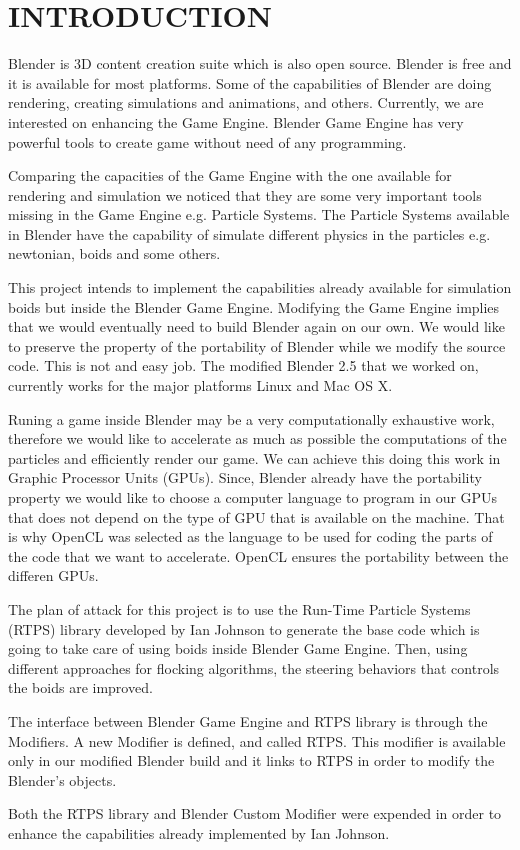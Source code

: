 \chapter{INTRODUCTION}


Blender is 3D content creation suite which is also open source. Blender is free and it is available for most platforms. Some of the capabilities of Blender are doing rendering, creating simulations and animations, and others. Currently, we are interested on enhancing the Game Engine. Blender Game Engine has very powerful tools to create game without need of any programming.  

Comparing the capacities of the Game Engine with the one available for rendering and simulation we noticed that they are some very important tools missing in the Game Engine e.g. Particle Systems. The Particle Systems available in Blender have the capability of simulate different physics in the particles e.g. newtonian, boids and some others. 

This project intends to implement the capabilities already available for simulation boids but inside the Blender Game Engine. Modifying the Game Engine implies that we would eventually need to build Blender again on our own. We would like to preserve the property of the portability of Blender while we modify the source code. This is not and easy job. The modified Blender 2.5 that we worked on, currently works for the major platforms Linux and Mac OS X.

Runing a  game inside Blender may be a very computationally exhaustive work, therefore we would like to  accelerate as much as possible the computations of the particles and efficiently render our game. We can achieve this doing this work in Graphic Processor Units (GPUs). Since, Blender already have the portability property we would like to choose a computer language to program in our GPUs that does not depend on the type of GPU that is available on the machine. That is why OpenCL was selected as the language to be used for coding the parts of the code that we want to accelerate. OpenCL ensures the portability between the differen GPUs.

The plan of attack for this project is to use the Run-Time Particle Systems (RTPS) library developed by Ian Johnson to generate the base code which is going to take care of using boids inside Blender Game Engine. Then, using different approaches for flocking algorithms, the steering behaviors that controls the boids are improved.

The interface between Blender Game Engine and RTPS library is through the Modifiers. A new Modifier is defined, and called RTPS. This modifier is available only in our modified Blender build and it links to RTPS in order to modify the Blender's objects. 

Both the RTPS library and Blender Custom Modifier were expended in order to enhance the capabilities already implemented by Ian Johnson.



